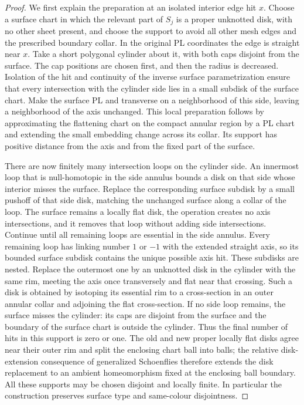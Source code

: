 \begin{proof}
We first explain the preparation at an isolated interior edge hit $x$.
Choose a surface chart in which the relevant part of $S_j$ is a proper
unknotted disk, with no other sheet present, and choose the support to
avoid all other mesh edges and the prescribed boundary collar.  In the
original PL coordinates the edge is straight near $x$.  Take a short
polygonal cylinder about it, with both caps disjoint from the surface.
The cap positions are chosen first, and then the radius is decreased.
Isolation of the hit and continuity of the inverse surface
parametrization ensure that every intersection with the cylinder side
lies in a small subdisk of the surface chart.  Make the surface PL and
transverse on a neighborhood of this side, leaving a neighborhood of the
axis unchanged.  This local preparation follows by approximating the
flattening chart on the compact annular region by a PL chart and
extending the small embedding change across its collar.  Its support
has positive distance from the axis and from the fixed part of the
surface.

There are now finitely many intersection loops on the cylinder side.
An innermost loop that is null-homotopic in the side annulus bounds a
disk on that side whose interior misses the surface.  Replace the
corresponding surface subdisk by a small pushoff of that side disk,
matching the unchanged surface along a collar of the loop.  The surface
remains a locally flat disk, the operation creates no axis intersections,
and it removes that loop without adding side intersections.  Continue
until all remaining loops are essential in the side annulus.  Every
remaining loop has linking number $1$ or $-1$ with the extended straight
axis, so its bounded surface subdisk contains the unique possible axis
hit.  These subdisks are nested.  Replace the outermost one by an
unknotted disk in the cylinder with the same rim, meeting the axis once
transversely and flat near that crossing.  Such a disk is obtained by
isotoping its essential rim to a cross-section in an outer annular
collar and adjoining the flat cross-section.  If no side loop remains,
the surface misses the cylinder: its caps are disjoint from the surface
and the boundary of the surface chart is outside the cylinder.
Thus the final number of hits in this support is zero or one.  The old
and new proper locally flat disks agree near their outer rim and split
the enclosing chart ball into balls; the relative disk-extension consequence of generalized
Schoenflies \cite[Theorem~5, p.~76]{Brown1960} therefore extends the disk replacement to an
ambient homeomorphism fixed at the enclosing ball boundary.  All these
supports may be chosen disjoint and locally finite.  In particular the
construction preserves surface type and same-colour disjointness.


\end{proof}
